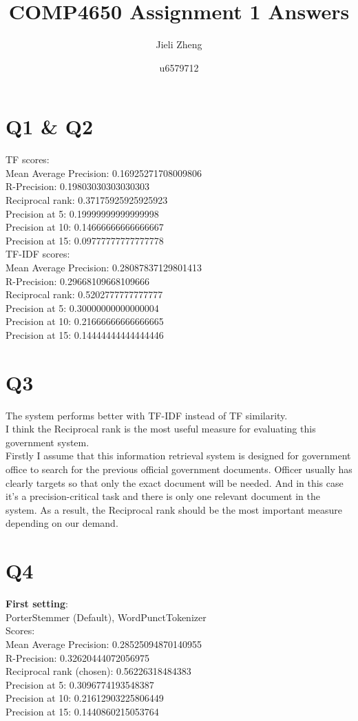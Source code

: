 \documentclass{article}
\title{COMP4650 Assignment 1 Answers}
\author{Jieli Zheng}
\date{u6579712}
\begin{document}
\maketitle

\section*{Q1 \& Q2}

TF scores:\\
Mean Average Precision: 0.16925271708009806\\
R-Precision: 0.19803030303030303\\
Reciprocal rank: 0.37175925925925923\\
Precision at 5: 0.19999999999999998\\
Precision at 10: 0.14666666666666667\\
Precision at 15: 0.09777777777777778\\

TF-IDF scores:\\
Mean Average Precision: 0.28087837129801413\\
R-Precision: 0.29668109668109666\\
Reciprocal rank: 0.5202777777777777\\
Precision at 5: 0.30000000000000004\\
Precision at 10: 0.21666666666666665\\
Precision at 15: 0.14444444444444446\\

\section*{Q3}
The system performs better with TF-IDF instead of TF similarity.\\
I think the Reciprocal rank is the most useful measure for evaluating this 
government system.\\
Firstly I assume that this information retrieval system is designed for government 
office to search for the previous official government documents. Officer usually 
has clearly targets so that only the exact document will be needed. And in this 
case it's a precision-critical task and there is only one relevant document in 
the system. As a result, the Reciprocal rank should be the most important 
measure depending on our demand.

\section*{Q4}
\textbf{First setting}:\\
PorterStemmer (Default), WordPunctTokenizer\\
Scores:\\
Mean Average Precision: 0.28525094870140955\\
R-Precision: 0.32620444072056975\\
Reciprocal rank (chosen): 0.56226318484383\\
Precision at 5: 0.3096774193548387\\
Precision at 10: 0.21612903225806449\\
Precision at 15: 0.1440860215053764\\
\end{document}
